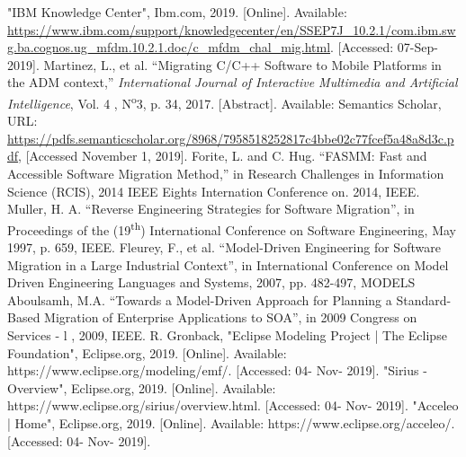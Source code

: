 \documentclass[conference]{IEEEtran}
\begin{document}
\begin{thebibliography}{00}
 "IBM Knowledge Center", Ibm.com, 2019. [Online]. Available: \url{https://www.ibm.com/support/knowledgecenter/en/SSEP7J_10.2.1/com.ibm.swg.ba.cognos.ug_mfdm.10.2.1.doc/c_mfdm_chal_mig.html}. [Accessed: 07-Sep-2019].
 Martinez, L., et al. ``Migrating C/C++ Software to Mobile Platforms in the ADM context,'' \textit{International Journal of Interactive Multimedia and Artificial Intelligence}, Vol. 4 , N\textsuperscript{o}3, p. 34, 2017. [Abstract]. Available: Semantics Scholar, URL: \url{https://pdfs.semanticscholar.org/8968/7958518252817c4bbe02c77fcef5a48a8d3c.pdf}, [Accessed November 1, 2019].
 Forite, L. and C. Hug. ``FASMM: Fast and Accessible Software Migration Method,'' in Research Challenges in Information Science (RCIS), 2014 IEEE Eights Internation Conference on. 2014, IEEE.
 Muller, H. A. ``Reverse Engineering Strategies for Software Migration'', in Proceedings of the (19\textsuperscript{th}) International Conference on Software Engineering, May 1997, p. 659, IEEE.
 Fleurey, F., et al. ``Model-Driven Engineering for Software Migration in a Large Industrial Context'', in International Conference on Model Driven Engineering Languages and Systems, 2007, pp. 482-497, MODELS
 Aboulsamh, M.A. ``Towards a Model-Driven Approach for Planning a Standard-Based Migration of Enterprise Applications to SOA'', in 2009 Congress on Services - l , 2009, IEEE.
 R. Gronback, "Eclipse Modeling Project | The Eclipse Foundation", Eclipse.org, 2019. [Online]. Available: https://www.eclipse.org/modeling/emf/. [Accessed: 04- Nov- 2019].
 "Sirius - Overview", Eclipse.org, 2019. [Online]. Available: https://www.eclipse.org/sirius/overview.html. [Accessed: 04- Nov- 2019].
 "Acceleo | Home", Eclipse.org, 2019. [Online]. Available: https://www.eclipse.org/acceleo/. [Accessed: 04- Nov- 2019].

\end{thebibliography}
\vspace{12pt}
\color{red}
\end{document}
